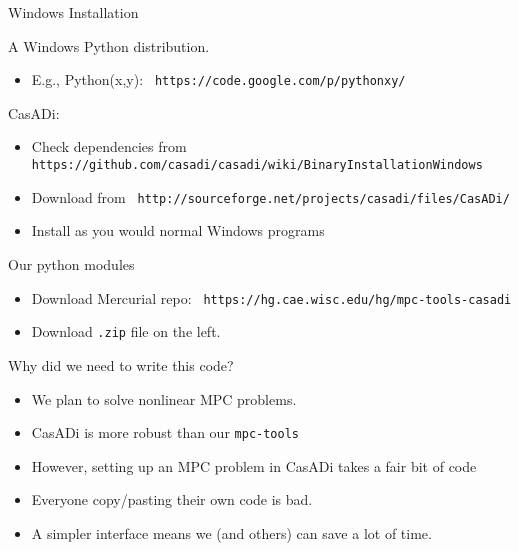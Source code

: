 \documentclass[xcolor=dvipsnames]{beamer}
\newcommand{\smallurl}[2][\footnotesize]{\texttt{#1 #2}}
\begin{document}
\begin{frame}{Windows Installation}

A Windows Python distribution.
\begin{itemize}
    \item E.g., Python(x,y): \smallurl{https://code.google.com/p/pythonxy/}
\end{itemize}

\medskip

CasADi:
\begin{itemize}
    \item Check dependencies from \smallurl{https://github.com/casadi/casadi/wiki/BinaryInstallationWindows}
    \item Download from \smallurl{http://sourceforge.net/projects/casadi/files/CasADi/}
    \item Install as you would normal Windows programs
\end{itemize}

\medskip

Our python modules
\begin{itemize}
    \item Download Mercurial repo: \smallurl{https://hg.cae.wisc.edu/hg/mpc-tools-casadi}
    \item Download \texttt{.zip} file on the left.
\end{itemize}

\end{frame}

\begin{frame}{Why did we need to write this code?}

\begin{itemize}
    \item We plan to solve nonlinear MPC problems.
    \item CasADi is more robust than our \texttt{mpc-tools}
    \item However, setting up an MPC problem in CasADi takes a fair bit of code
    \item Everyone copy/pasting their own code is bad.
    \item A simpler interface means we (and others) can save a lot of time.
\end{itemize}

\end{frame}
\end{document}
